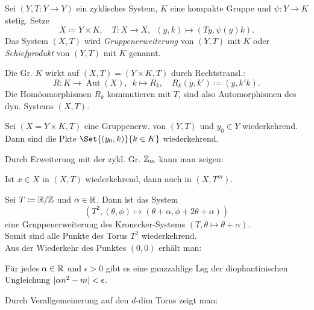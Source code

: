 \documentclass{cheat-sheet}
\DeclareMathOperator{\Aut}{Aut} %
\begin{document}
\begin{defn}
  Sei $(Y, T : Y \to Y)$ ein zyklisches System, $K$ eine kompakte Gruppe und $\psi : Y \to K$ stetig. Setze
  \[
    X \coloneqq Y \times K, \quad
    T : X \to X, \enspace (y, k) \mapsto (Ty, \psi(y)k).
  \]
  Das System $(X, T)$ wird \emph{Gruppenerweiterung} von $(Y, T)$ mit $K$ oder \emph{Schiefprodukt} von $(Y, T)$ mit $K$ genannt.
\end{defn}

\begin{bem}
  Die Gr. $K$ wirkt auf $(X, T) = (Y \!\times\! K, T)$ durch Rechtstransl.:
  \[
    R : K \to \Aut(X), \enspace k \mapsto R_k, \quad
    R_k(y,k') \coloneqq (y,k'k).
  \]
  Die Homöomorphismen $R_k$ kommutieren mit $T$, sind also Automorphismen des dyn. Systems $(X, T)$.
\end{bem}

\begin{thm}
  Sei $(X \!=\! Y \!\times\! K, T)$ eine Gruppenerw. von $(Y, T)$ und $y_0 \in Y$ wiederkehrend. Dann sind die Pkte $\Set{(y_0, k)}{k \in K}$ wiederkehrend.
\end{thm}

\begin{bem}
  Durch Erweiterung mit der zykl. Gr. $\mathbb{Z}_m$ kann man zeigen:
\end{bem}

\begin{prop}
  Ist $x \in X$ in $(X, T)$ wiederkehrend, dann auch in $(X, T^m)$.
\end{prop}

\begin{bsp}
  Sei $T \coloneqq \mathbb{R} / \mathbb{Z}$ und $\alpha \in \mathbb{R}$. Dann ist das System
  \[ (T^2, (\theta, \phi) \mapsto (\theta + \alpha, \phi + 2 \theta + \alpha)) \]
  eine Gruppenerweiterung des Kronecker-Systems $(T, \theta \mapsto \theta + \alpha)$. \\
  Somit sind alle Punkte des Torus $T^2$ wiederkehrend. \\
  Aus der Wiederkehr des Punktes $(0, 0)$ erhält man:
\end{bsp}

\begin{prop}
  Für jedes $\alpha \in \mathbb{R}$ und $\epsilon > 0$ gibt es eine ganzzahlige Lsg der diophantinischen Ungleichung
  $\lvert\alpha n^2 - m\rvert < \epsilon$.
\end{prop}

\begin{bem}
  Durch Verallgemeinerung auf den $d$-dim Torus zeigt man:
\end{bem}
\end{document}

